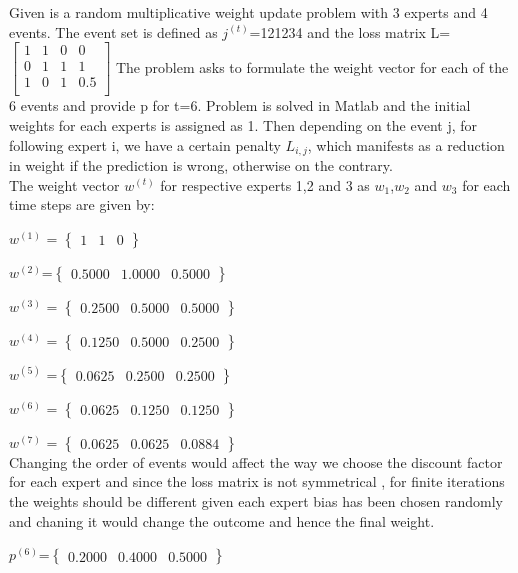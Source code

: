 
Given is a random multiplicative weight update problem with 3 experts and 4 events. The event set is defined as $j^{(t)}$=121234 and the loss matrix L=$ \begin{bmatrix}
1 & 1 & 0 & 0\\
0 & 1 & 1 & 1\\
1 & 0 & 1 & 0.5\\
\end{bmatrix}
$
The problem asks to formulate the weight vector for each of the 6 events and provide p for t=6. Problem is solved in Matlab and the initial weights for each experts is assigned as 1. Then depending on the event j, for following expert i, we have a certain penalty $ L_{i,j} $, which manifests as a reduction in weight if the prediction is 
wrong, otherwise on the contrary. 
\\
The weight vector $w^{(t)}$ for respective experts 1,2 and 3 as $w_1$,$ w_2$ and $w_3$ for each time steps are given by:

$w^{(1)}$ = $\begin{Bmatrix}
1 & 1 & 0
\end{Bmatrix}$
		
$w^{(2)}$=$ \begin{Bmatrix}	
0.5000  & 1.0000  & 0.5000
\end{Bmatrix}$



$w^{(3)}$ = $ \begin{Bmatrix}	0.2500 &   0.5000 &   0.5000	\end{Bmatrix}$



$w^{(4)}$ = $\begin{Bmatrix}	0.1250   & 0.5000   & 0.2500	\end{Bmatrix}	$



$w^{(5)}$ =$  \begin{Bmatrix}	0.0625   & 0.2500  &  0.2500		\end{Bmatrix}$



$w^{(6)}$ = $  \begin{Bmatrix}	0.0625   & 0.1250   & 0.1250	\end{Bmatrix}	$



$w^{(7)}$ = $\begin{Bmatrix}	0.0625   & 0.0625  &  0.0884\end{Bmatrix}$
\\
Changing the order of events would affect the way we choose the discount factor for each expert and since the loss matrix is not symmetrical , for finite iterations the weights should be different given each expert bias has been chosen randomly and chaning it would change the outcome and hence the final weight.

$p^{(6)}$=$\begin{Bmatrix} 0.2000   &0.4000 &   0.5000\end{Bmatrix}$



